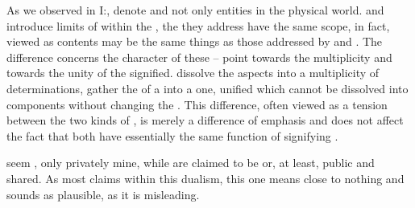 
As we observed in I:,  denote
 and not only  entities in the physical world.
 and  introduce limits of  within the
\hoa, the  they address have the same scope, in fact, viewed as
 contents may be the same things as those addressed by
 and .  The difference concerns the
character of these  --  point towards the multiplicity
and  towards the unity of the signified.   dissolve the
 aspects into a multiplicity of  determinations,
 gather the  of a  into a one, unified
 which cannot be dissolved into components without changing the
.  This difference, often viewed as a tension between the two
kinds of , is merely a difference of emphasis and does not affect the fact that
both have essentially the same function of signifying .


\pa\label{pa:moodCommunicate}
 seem , only privately mine, while  are
claimed to be  or, at least, public and shared. As most claims
within this dualism, this one means close to nothing and sounds as plausible, as
it is misleading.

